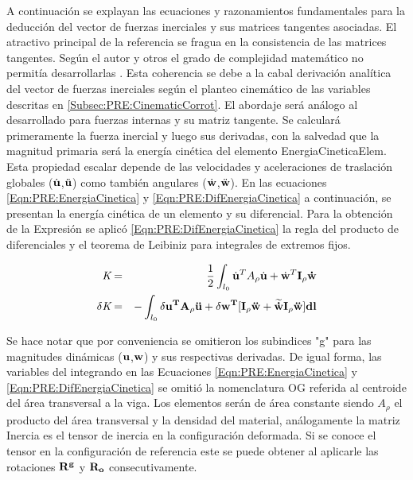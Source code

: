 A continuación se explayan las ecuaciones y razonamientos fundamentales para la deducción del vector de fuerzas inerciales y sus matrices tangentes asociadas. El atractivo principal de la referencia \citet{Le2014} se fragua en la consistencia de las matrices tangentes. Según el autor y otros el grado de complejidad matemático no permitía desarrollarlas \cite{Crisfield}. Esta coherencia se debe a la cabal derivación analítica del vector de fuerzas inerciales según el planteo cinemático de las variables descritas en \ref{Subsec:PRE:CinematicCorrot}. El abordaje será análogo al desarrollado para fuerzas internas y su matriz tangente. Se calculará primeramente la fuerza inercial y luego sus derivadas, con la salvedad que la magnitud primaria será la energía cinética del elemento \gls{EnergiaCineticaElem}. Esta propiedad escalar depende de las velocidades y aceleraciones de traslación globales ($\dot{\bf{u}}$,$\ddot{\bf{u}}$) como también angulares ($\dot{\bf{w}}$,$\ddot{\bf{w}}$). En las ecuaciones \eqref{Eqn:PRE:EnergiaCinetica} y \eqref{Eqn:PRE:DifEnergiaCinetica} a continuación, se presentan la energía cinética de un elemento y su diferencial. Para la obtención de la Expresión se aplicó \eqref{Eqn:PRE:DifEnergiaCinetica} la regla del producto de diferenciales y el teorema de Leibiniz para integrales de extremos fijos.

\begin{eqnarray}
		\textit{K}&=&\frac{1}{2}\int_{l_0} \dot{\bf{u}}^T A_{\rho} \dot{\bf{u}} +
		\dot{\bf{w}}^T \bf{I_{\rho}}\dot{\bf{w}}
		\label{Eqn:PRE:EnergiaCinetica}\\
		\delta\textit{K}&=&-\int_{l_0} \delta \bf{u}^T A_{\rho} \ddot{\bf{u}} +\delta
		\bf{w}^T[\bf{I_{\rho}}\ddot{\bf{w}}+\widetilde{\dot{\bf{w}}}\bf{I_{\rho}}\ddot{\bf{w}}]
		dl
		\label{Eqn:PRE:DifEnergiaCinetica}
\end{eqnarray}


Se hace notar que por conveniencia se omitieron los subindices "g" para las magnitudes dinámicas ($\bf{u}$,$\bf{w}$)  y sus respectivas derivadas. De igual forma, las variables del integrando en las Ecuaciones  \eqref{Eqn:PRE:EnergiaCinetica} y \eqref{Eqn:PRE:DifEnergiaCinetica} se omitió la nomenclatura OG referida al centroide del área transversal a la viga. Los elementos serán de área constante siendo  $A_{\rho}$  el producto del área transversal  y la densidad del material, análogamente la matriz \gls{Inercia} es el tensor de inercia en la configuración deformada. Si se conoce el tensor en la configuración de referencia este se puede obtener al aplicarle las rotaciones $\bf{R}^g$ y $\bf{R}_o$ consecutivamente.

